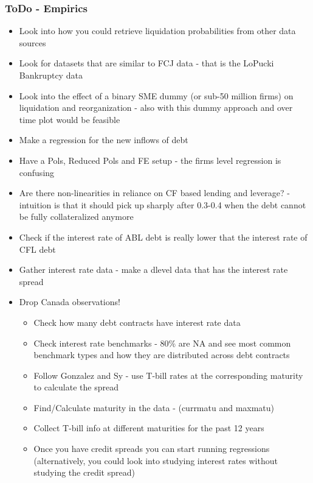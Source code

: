 \documentclass[12pt]{article}
\begin{document}
\subsubsection*{ToDo - Empirics}
\begin{itemize}\setlength\itemsep{0em} \small
    \item Look into how you could retrieve liquidation probabilities from other data sources \checkmark
    \item Look for datasets that are similar to FCJ data - that is the LoPucki Bankruptcy data \checkmark
    \item Look into the effect of a binary SME dummy (or sub-50 million firms) on liquidation and reorganization - also with this dummy approach and over time plot would be feasible \checkmark
    \item Make a regression for the new inflows of debt \checkmark
    \item Have a Pols, Reduced Pols and FE  setup - the firms level regression is confusing
    \item Are there non-linearities in reliance on CF based lending and leverage? - intuition is that it should pick up sharply after 0.3-0.4 when the debt cannot be fully collateralized anymore 
    \item Check if the interest rate of ABL debt is really lower that the interest rate of CFL debt \checkmark
    \item Gather interest rate data - make a dlevel data that has the interest rate spread \checkmark
    \item Drop Canada observations! 
    \begin{itemize}
        \item Check how many debt contracts have interest rate data \checkmark
        \item Check interest rate benchmarks - 80\% are NA and see most common benchmark types and how they are distributed across debt contracts  \checkmark
        \item Follow Gonzalez and Sy - use T-bill rates at the corresponding maturity to calculate the spread \checkmark
        \item Find/Calculate maturity in the data - (currmatu and maxmatu) \checkmark
        \item Collect T-bill info at different maturities for the past 12 years \checkmark
        \item Once you have credit spreads you can start running regressions (alternatively, you could look into studying interest rates without studying the credit spread) \checkmark

\end{itemize}
\end{itemize}
\end{document}
